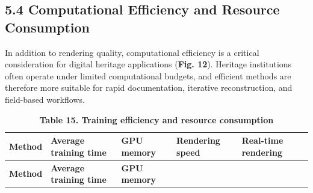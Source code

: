 \subsection{5.4 Computational Efficiency and
Resource
Consumption}\label{computational-efficiency-and-resource-consumption}

In addition to rendering quality, computational efficiency is a
critical consideration for digital heritage applications (\textbf{Fig.
12}). Heritage institutions often operate under limited computational
budgets, and efficient methods are therefore more suitable for rapid
documentation, iterative reconstruction, and field-based workflows.

\begin{longtable}[]{@{}
  >{\centering\arraybackslash}p{}
  >{\centering\arraybackslash}p{}
  >{\centering\arraybackslash}p{}
  >{\centering\arraybackslash}p{}
  >{\centering\arraybackslash}p{}@{}}
\caption{\textbf{Table 15. Training efficiency and resource
consumption}}\tabularnewline
\toprule\noalign{}
\begin{minipage}[b]{\linewidth}\centering
\textbf{Method}
\end{minipage} & \begin{minipage}[b]{\linewidth}\centering
\textbf{Average training time}
\end{minipage} & \begin{minipage}[b]{\linewidth}\centering
\textbf{GPU memory}
\end{minipage} & \begin{minipage}[b]{\linewidth}\centering
\textbf{Rendering speed}
\end{minipage} & \begin{minipage}[b]{\linewidth}\centering
\textbf{Real-time rendering}
\end{minipage} \\
\midrule\noalign{}
\endfirsthead
\toprule\noalign{}
\begin{minipage}[b]{\linewidth}\centering
\textbf{Method}
\end{minipage} & \begin{minipage}[b]{\linewidth}\centering
\textbf{Average training time}
\end{minipage} & \begin{minipage}[b]{\linewidth}\centering
\textbf{GPU memory}

\end{minipage}
\end{longtable}
